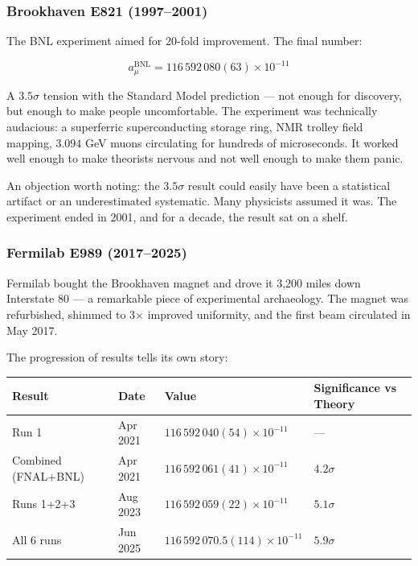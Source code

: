 \documentclass[12pt,a4paper]{article}
\begin{document}
\subsubsection{Brookhaven E821 (1997--2001)}

The BNL experiment aimed for 20-fold improvement. The final number:

\[a_{\mu}^{\text{BNL}} = 116\,592\,080(63) \times 10^{-11}\]

A $3.5\sigma$ tension with the Standard Model prediction --- not enough for discovery, but enough to make people uncomfortable. The experiment was technically audacious: a superferric superconducting storage ring, NMR trolley field mapping, $3.094$ GeV muons circulating for hundreds of microseconds. It worked well enough to make theorists nervous and not well enough to make them panic.

An objection worth noting: the $3.5\sigma$ result could easily have been a statistical artifact or an underestimated systematic. Many physicists assumed it was. The experiment ended in 2001, and for a decade, the result sat on a shelf.

\subsubsection{Fermilab E989 (2017--2025)}

Fermilab bought the Brookhaven magnet and drove it 3,200 miles down Interstate 80 --- a remarkable piece of experimental archaeology. The magnet was refurbished, shimmed to 3$\times$ improved uniformity, and the first beam circulated in May 2017.

The progression of results tells its own story:

\begin{table}[htbp]
\centering
\small
{}
\begin{tabularx}{\textwidth}{>{\centering\arraybackslash}X >{\centering\arraybackslash}X >{\centering\arraybackslash}X >{\centering\arraybackslash}X}
\toprule
\rowcolor{gray!25}\textbf{Result} & \textbf{Date} & \textbf{Value} & \textbf{Significance vs Theory} \\
\midrule
\rowcolors{1}{white}{gray!10}
Run 1 & Apr 2021 & $116\,592\,040(54) \times 10^{-11}$ & --- \\
Combined (FNAL+BNL) & Apr 2021 & $116\,592\,061(41) \times 10^{-11}$ & $4.2\sigma$ \\
Runs 1+2+3 & Aug 2023 & $116\,592\,059(22) \times 10^{-11}$ & $5.1\sigma$ \\
All 6 runs & Jun 2025 & $116\,592\,070.5(114) \times 10^{-11}$ & $5.9\sigma$ \\
\bottomrule
\end{tabularx}
\end{table}
\end{document}
